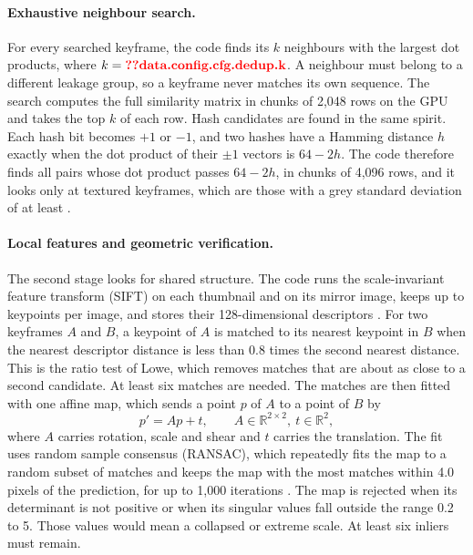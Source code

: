 \paragraph{Exhaustive neighbour search.} For every searched keyframe, the code finds its $k$ neighbours with the largest dot products, where $k=\Res{data.config.cfg.dedup.k}$. A neighbour must belong to a different leakage group, so a keyframe never matches its own sequence. The search computes the full similarity matrix in chunks of 2,048 rows on the GPU and takes the top $k$ of each row. Hash candidates are found in the same spirit. Each hash bit becomes $+1$ or $-1$, and two hashes have a Hamming distance $h$ exactly when the dot product of their $\pm1$ vectors is $64-2h$. The code therefore finds all pairs whose dot product passes $64-2h$, in chunks of 4,096 rows, and it looks only at textured keyframes, which are those with a grey standard deviation of at least .

\paragraph{Local features and geometric verification.} The second stage looks for shared structure. The code runs the scale-invariant feature transform (SIFT) on each thumbnail and on its mirror image, keeps up to  keypoints per image, and stores their 128-dimensional descriptors \cite{lowe2004sift}. For two keyframes $A$ and $B$, a keypoint of $A$ is matched to its nearest keypoint in $B$ when the nearest descriptor distance is less than 0.8 times the second nearest distance. This is the ratio test of Lowe, which removes matches that are about as close to a second candidate. At least six matches are needed. The matches are then fitted with one affine map, which sends a point $p$ of $A$ to a point of $B$ by
\begin{equation}
p'=Ap+t,\qquad A\in\mathbb{R}^{2\times2},\ t\in\mathbb{R}^{2},\label{eq:data-affine}
\end{equation}
where $A$ carries rotation, scale and shear and $t$ carries the translation. The fit uses random sample consensus (RANSAC), which repeatedly fits the map to a random subset of matches and keeps the map with the most matches within 4.0 pixels of the prediction, for up to 1,000 iterations \cite{fischler1981ransac}. The map is rejected when its determinant is not positive or when its singular values fall outside the range 0.2 to 5. Those values would mean a collapsed or extreme scale. At least six inliers must remain.

